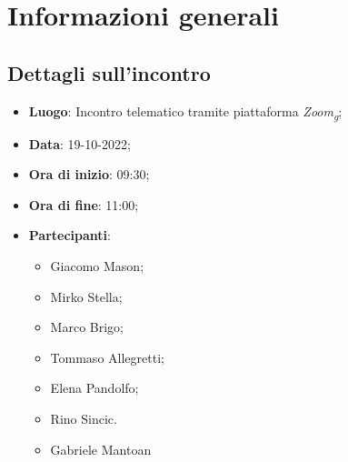 \section{Informazioni generali}

\subsection{Dettagli sull'incontro}
\begin{itemize}
\item \textbf{Luogo}: Incontro telematico tramite piattaforma \textit{Zoom\textsubscript{g}};
\item \textbf{Data}: 19-10-2022;
\item \textbf{Ora di inizio}: 09:30;
\item \textbf{Ora di fine}: 11:00;
\item \textbf{Partecipanti}: 
\begin{itemize}
	\item Giacomo Mason;
	\item Mirko Stella;
	\item Marco Brigo;
	\item Tommaso Allegretti;
	\item Elena Pandolfo;
	\item Rino Sincic.
	\item Gabriele Mantoan
\end{itemize}
\end{itemize}



